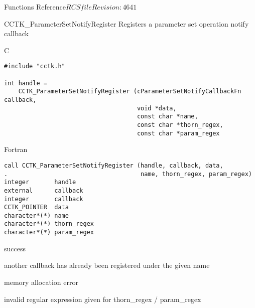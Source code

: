 \begin{cactuspart}{ Functions Reference}{$RCSfile$}{$Revision: 4641 $}
\begin{FunctionDescription}{CCTK\_ParameterSetNotifyRegister}
\label{CCTK-ParameterSetNotifyRegister}
Registers a parameter set operation notify callback

\begin{SynopsisSection}
\begin{Synopsis}{C}
\begin{verbatim}
#include "cctk.h"

int handle =
    CCTK_ParameterSetNotifyRegister (cParameterSetNotifyCallbackFn callback,
                                     void *data,
                                     const char *name,
                                     const char *thorn_regex,
                                     const char *param_regex
\end{verbatim}
\end{Synopsis}
\begin{Synopsis}{Fortran}
\begin{verbatim}
call CCTK_ParameterSetNotifyRegister (handle, callback, data,
.                                     name, thorn_regex, param_regex)
integer       handle
external      callback
integer       callback
CCTK_POINTER  data
character*(*) name
character*(*) thorn_regex
character*(*) param_regex
\end{verbatim}
\end{Synopsis}
\end{SynopsisSection}

\begin{ResultSection}
\begin{Result}{0}
success
\end{Result}
\begin{Result}{-1}
another callback has already been registered under the given name
\end{Result}
\begin{Result}{-2}
memory allocation error
\end{Result}
\begin{Result}{-3}
invalid regular expression given for thorn\_regex / param\_regex
\end{Result}
\end{ResultSection}


\end{FunctionDescription}
\end{cactuspart}
